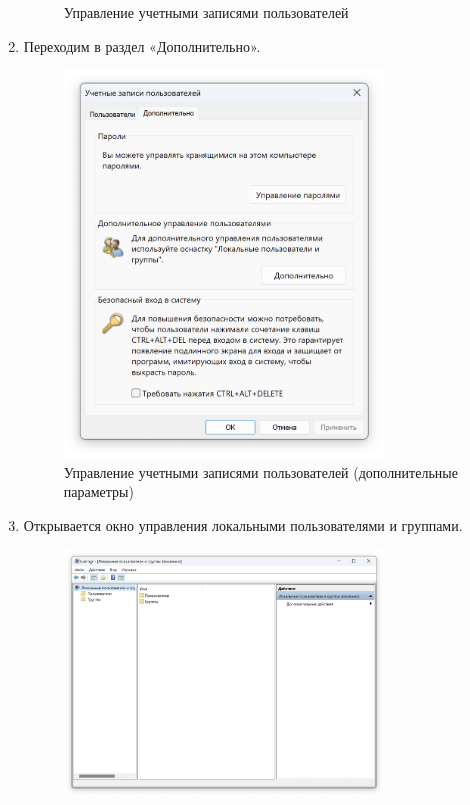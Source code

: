 \documentclass[a4paper, 14pt]{report}
\begin{document}
\begin{enumerate}
{\begin{figure}[H]
              \caption{Управление учетными записями пользователей}
          \end{figure}
          }
    \item {Переходим в раздел «Дополнительно».
          \begin{figure}[H]
              \centering
              \includegraphics[width=0.8\textwidth]{../images/control_userpasswords2_extra.png}
              \caption{Управление учетными записями пользователей (дополнительные параметры)}
          \end{figure}
          }
    \item {Открывается окно управления локальными пользователями и группами.
          \begin{figure}[H]
              \centering
              \includegraphics[width=0.8\textwidth]{../images/lusrmgr.png}

\end{figure}}
\end{enumerate}
\end{document}
